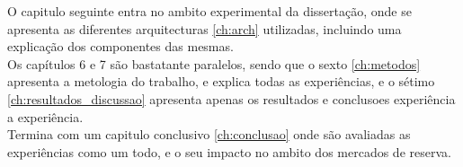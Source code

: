 O capitulo seguinte entra no ambito experimental da dissertação, onde se apresenta as diferentes arquitecturas \ref{ch:arch} utilizadas, incluindo uma explicação dos componentes das mesmas. \\

Os capítulos 6 e 7 são bastatante paralelos, sendo que o sexto \ref{ch:metodos} apresenta a metologia do trabalho, e explica todas as experiências, e o sétimo \ref{ch:resultados_discussao} apresenta apenas os resultados e conclusoes experiência a experiência. \\

Termina com um capitulo conclusivo \ref{ch:conclusao} onde são avaliadas as experiências como um todo, e o seu impacto no ambito dos mercados de reserva. \\

